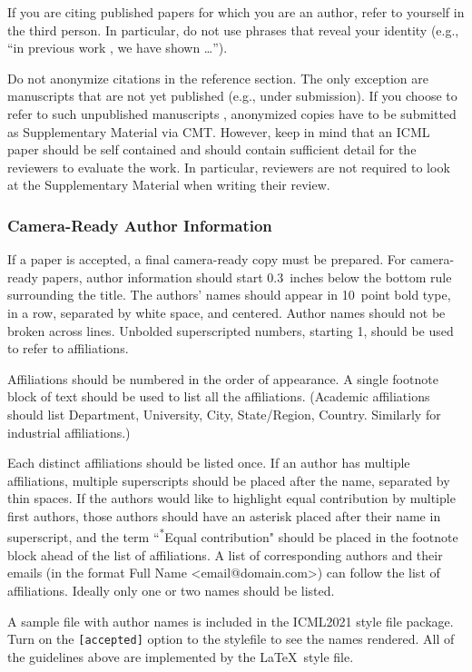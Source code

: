 If you are citing published papers for which you are an author, refer
to yourself in the third person. In particular, do not use phrases
that reveal your identity (e.g., ``in previous work \cite{langley00}, we
have shown \ldots'').

Do not anonymize citations in the reference section. The only exception are manuscripts that are
not yet published (e.g., under submission). If you choose to refer to
such unpublished manuscripts \cite{anonymous}, anonymized copies have
to be submitted
as Supplementary Material via CMT\@. However, keep in mind that an ICML
paper should be self contained and should contain sufficient detail
for the reviewers to evaluate the work. In particular, reviewers are
not required to look at the Supplementary Material when writing their
review.

\subsubsection{Camera-Ready Author Information}
\label{final author}

If a paper is accepted, a final camera-ready copy must be prepared.
%
For camera-ready papers, author information should start 0.3~inches below the
bottom rule surrounding the title. The authors' names should appear in 10~point
bold type, in a row, separated by white space, and centered. Author names should
not be broken across lines. Unbolded superscripted numbers, starting 1, should
be used to refer to affiliations.

Affiliations should be numbered in the order of appearance. A single footnote
block of text should be used to list all the affiliations. (Academic
affiliations should list Department, University, City, State/Region, Country.
Similarly for industrial affiliations.)

Each distinct affiliations should be listed once. If an author has multiple
affiliations, multiple superscripts should be placed after the name, separated
by thin spaces. If the authors would like to highlight equal contribution by
multiple first authors, those authors should have an asterisk placed after their
name in superscript, and the term ``\textsuperscript{*}Equal contribution"
should be placed in the footnote block ahead of the list of affiliations. A
list of corresponding authors and their emails (in the format Full Name
\textless{}email@domain.com\textgreater{}) can follow the list of affiliations.
Ideally only one or two names should be listed.

A sample file with author names is included in the ICML2021 style file
package. Turn on the \texttt{[accepted]} option to the stylefile to
see the names rendered. All of the guidelines above are implemented
by the \LaTeX\ style file.

